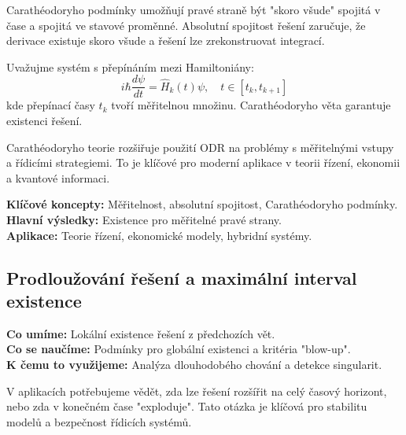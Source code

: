 \begin{intuition}
Carathéodoryho podmínky umožňují pravé straně být "skoro všude" spojitá v čase a spojitá ve stavové proměnné. Absolutní spojitost řešení zaručuje, že derivace existuje skoro všude a řešení lze zrekonstruovat integrací.
\end{intuition}

\begin{example}
Uvažujme systém s přepínáním mezi Hamiltoniány:
\[
i\hbar\frac{d\psi}{dt} = \hat{H}_k(t)\psi, \quad t \in [t_k, t_{k+1}]
\]
kde přepínací časy $t_k$ tvoří měřitelnou množinu. Carathéodoryho věta garantuje existenci řešení.
\end{example}

\begin{keyinsight}
Carathéodoryho teorie rozšiřuje použití ODR na problémy s měřitelnými vstupy a řídicími strategiemi. To je klíčové pro moderní aplikace v teorii řízení, ekonomii a kvantové informaci.
\end{keyinsight}

\begin{summary}
\textbf{Klíčové koncepty:} Měřitelnost, absolutní spojitost, Carathéodoryho podmínky. \\
\textbf{Hlavní výsledky:} Existence pro měřitelné pravé strany. \\
\textbf{Aplikace:} Teorie řízení, ekonomické modely, hybridní systémy.
\end{summary}

\spc

\subsection{Prodloužování řešení a maximální interval existence}

\begin{scaffold}
\textbf{Co umíme:} Lokální existence řešení z předchozích vět. \\
\textbf{Co se naučíme:} Podmínky pro globální existenci a kritéria "blow-up". \\
\textbf{K čemu to využijeme:} Analýza dlouhodobého chování a detekce singularit.
\end{scaffold}

\begin{motivation}
V aplikacích potřebujeme vědět, zda lze řešení rozšířit na celý časový horizont, nebo zda v konečném čase "exploduje". Tato otázka je klíčová pro stabilitu modelů a bezpečnost řídicích systémů.
\end{motivation}

